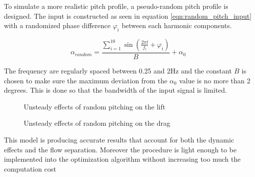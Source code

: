 \par To simulate a more realistic pitch profile, a pseudo-random pitch profile is designed.
The input is constructed as seen in equation \ref{eqn:random_pitch_input} with a randomized phase difference $\varphi_i$ between each harmonic components.

\begin{equation}
	\alpha_{random}= \frac{\sum_{i=1}^{10} \sin (\frac{2 \pi t}{f_i} + \varphi_i)}{B} + \alpha_{0}
	\label{eqn:random_pitch_input}
\end{equation}

The frequency are regularly spaced between 0.25 and 2Hz and the constant $B$ is chosen to make sure the maximum deviation from the $\alpha_0$ value is no more than 2 degrees.
This is done so that the bandwidth of the input signal is limited.

\begin{figure}[h]
  \begin{center}
  \end{center}
  \caption{Unsteady effects of random pitching on the lift}
  \label{fig:Pitching_random_Cl_12}
\end{figure}

\begin{figure}[h]
  \begin{center}
  \end{center}
  \caption{Unsteady effects of random pitching on the drag}
  \label{fig:Pitching_random_Cd_12}
\end{figure}


\FloatBarrier

\par This model is producing accurate results that account for both the dynamic effects and the flow separation.
Moreover the procedure is light enough to be implemented into the optimization algorithm without increasing too much the computation cost
